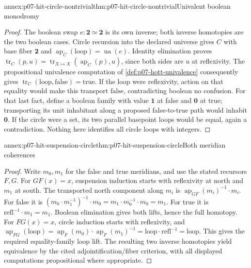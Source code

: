\begin{annexitem}{annex:p07-hit-circle-nontrivial}{thm:p07-hit-circle-nontrivial}{Univalent boolean monodromy}
\begin{proof}
The boolean swap \(e:\mathbf2\simeq\mathbf2\) is its own inverse;
both inverse homotopies are the two boolean cases. Circle recursion into
the declared universe gives \(C\) with base fiber \(\mathbf2\) and
\(\operatorname{ap}_C(\mathrm{loop})=\operatorname{ua}(e)\).
Identity elimination proves
\(\operatorname{tr}_C(p,u)=
\operatorname{tr}_{X\mapsto X}(\operatorname{ap}_C(p),u)\), since both
sides are \(u\) at reflexivity. The propositional univalence computation
of \cref{def:p07-hott-univalence} consequently gives
\(\operatorname{tr}_C(\mathrm{loop},\mathrm{false})=\mathrm{true}\).
If the loop were reflexivity, action on that equality would make this
transport \(\mathrm{false}\), contradicting boolean no confusion.
For that last fact, define a boolean family with value \(\mathbf1\) at
false and \(\mathbf0\) at true; transporting its unit inhabitant along
a proposed false-to-true path would inhabit \(\mathbf0\).
If the circle were a set, its two parallel basepoint loops would be equal,
again a contradiction. Nothing here identifies all circle loops with integers.
\end{proof}
\end{annexitem}

\begin{annexitem}{annex:p07-hit-suspension-circle}{thm:p07-hit-suspension-circle}{Both meridian coherences}
\begin{proof}
Write \(m_0,m_1\) for the false and true meridians, and use the stated
recursors \(F,G\). For \(GF(x)=x\), suspension induction starts with
reflexivity at north and \(m_1\) at south. The transported north component
along \(m_i\) is \(\operatorname{ap}_{GF}(m_i)^{-1}\cdot m_i\).
For false it is
\((m_0\cdot m_1^{-1})^{-1}\cdot m_0
=m_1\cdot m_0^{-1}\cdot m_0=m_1\).
For true it is \(\mathrm{refl}^{-1}\cdot m_1=m_1\).
Boolean elimination gives both lifts, hence the full homotopy.
For \(FG(x)=x\), circle induction starts with reflexivity, and
\(\operatorname{ap}_{FG}(\mathrm{loop})
=\operatorname{ap}_F(m_0)\cdot\operatorname{ap}_F(m_1)^{-1}
=\mathrm{loop}\cdot\mathrm{refl}^{-1}=\mathrm{loop}\).
This gives the required equality-family loop lift. The resulting two
inverse homotopies yield equivalence by the cited adjointification/fiber
criterion, with all displayed computations propositional where appropriate.
\end{proof}
\end{annexitem}

